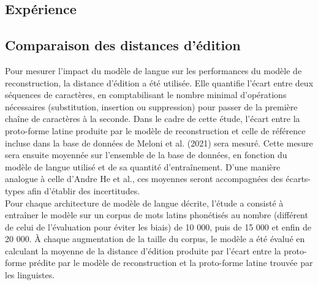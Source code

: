 \documentclass[10pt, french]{article}
\begin{document}
\begin{multicols*}{2}
\section{Expérience}
\subsection{Comparaison des distances d'édition}
Pour mesurer l'impact du modèle de langue sur les performances du modèle de reconstruction, la distance d'édition a été utilisée. Elle quantifie l'écart entre deux séquences de caractères, en comptabilisant le nombre minimal d'opérations nécessaires (substitution, insertion ou suppression) pour passer de la première chaîne de caractères à la seconde. Dans le cadre de cette étude, l'écart entre la proto-forme latine produite par le modèle de reconstruction et celle de référence incluse dans la base de données de Meloni et al. (2021)\cite{meloni} sera mesuré. Cette mesure sera ensuite moyennée sur l'ensemble de la base de données, en fonction du modèle de langue utilisé et de sa quantité d'entraînement. D'une manière analogue à celle d'Andre He et al., ces moyennes seront accompagnées des écarts-types afin d'établir des incertitudes.\\
Pour chaque architecture de modèle de langue décrite, l'étude a consisté à entraîner le modèle sur un corpus de mots latins phonétisés au nombre (différent de celui de l'évaluation pour éviter les biais) de 10 000, puis de 15 000 et enfin de 20 000. À chaque augmentation de la taille du corpus, le modèle a été évalué en calculant la moyenne de la distance d'édition produite par l'écart entre la proto-forme prédite par le modèle de reconstruction et la proto-forme latine trouvée par les linguistes.


\end{multicols*}
\end{document}
